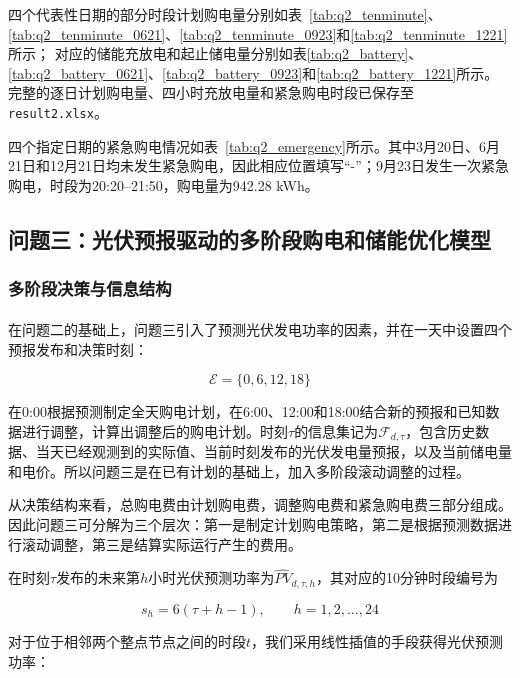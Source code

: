 \documentclass[UTF8]{ctexart}
\let\oldcite\cite
\renewcommand{\cite}[1]{\textsuperscript{\oldcite{#1}}}
\begin{document}
    四个代表性日期的部分时段计划购电量分别如表~\ref{tab:q2_tenminute}、\ref{tab:q2_tenminute_0621}、\ref{tab:q2_tenminute_0923}和\ref{tab:q2_tenminute_1221}所示；
    对应的储能充放电和起止储电量分别如表\ref{tab:q2_battery}、\ref{tab:q2_battery_0621}、\ref{tab:q2_battery_0923}和\ref{tab:q2_battery_1221}所示。
    完整的逐日计划购电量、四小时充放电量和紧急购电时段已保存至\texttt{result2.xlsx}。\par
    四个指定日期的紧急购电情况如表~\ref{tab:q2_emergency}所示。其中3月20日、6月21日和12月21日均未发生紧急购电，因此相应位置填写“-”；9月23日发生一次紧急购电，时段为20:20--21:50，购电量为942.28 kWh。
    \subsection{问题三：光伏预报驱动的多阶段购电和储能优化模型}
    
    \subsubsection{多阶段决策与信息结构}
    
    在问题二的基础上，问题三引入了预测光伏发电功率的因素\cite{article}，并在一天中设置四个预报发布和决策时刻：
    
    \begin{equation}
        \mathcal E=\{0,6,12,18\}
    \end{equation}
    
    在0:00根据预测制定全天购电计划，在6:00、12:00和18:00结合新的预报和已知数据进行调整，计算出调整后的购电计划。时刻$\tau$的信息集记为$\mathcal F_{d,\tau}$，包含历史数据、当天已经观测到的实际值、当前时刻发布的光伏发电量预报，以及当前储电量和电价。所以问题三是在已有计划的基础上，加入多阶段滚动调整的过程。\par
    
    从决策结构来看，总购电费由计划购电费，调整购电费和紧急购电费三部分组成。因此问题三可分解为三个层次：第一是制定计划购电策略，第二是根据预测数据进行滚动调整，第三是结算实际运行产生的费用。\par
    
    在时刻$\tau$发布的未来第$h$小时光伏预测功率为$\widehat{PV}_{d,\tau,h}$，其对应的10分钟时段编号为
    
    \begin{equation}
        s_h=6(\tau+h-1),\qquad h=1,2,\ldots,24
    \end{equation}
    
    对于位于相邻两个整点节点之间的时段$t$，我们采用线性插值的手段获得光伏预测功率：
    
\end{document}
